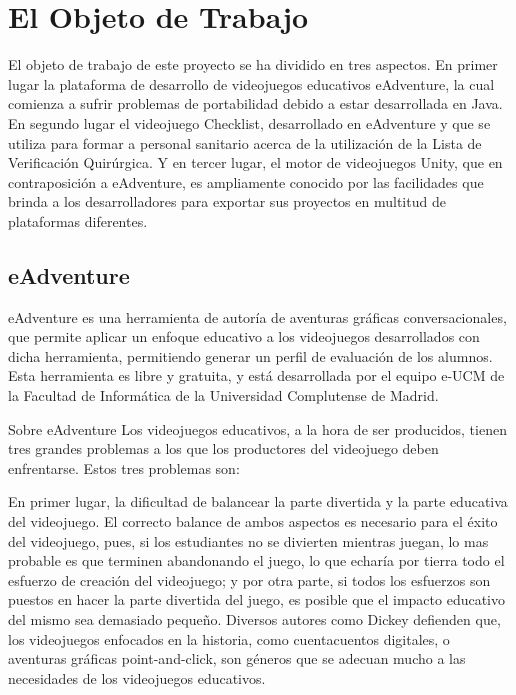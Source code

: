 \section{El Objeto de Trabajo}
\label{objetodetrabajo}

El objeto de trabajo de este proyecto se ha dividido en tres aspectos. En primer lugar la plataforma de desarrollo de videojuegos educativos eAdventure, la cual comienza a sufrir problemas de portabilidad debido a estar desarrollada en Java. En segundo lugar el videojuego Checklist, desarrollado en eAdventure y que se utiliza para formar a personal sanitario acerca de la utilización de la Lista de Verificación Quirúrgica. Y en tercer lugar, el motor de videojuegos Unity, que en contraposición a eAdventure, es ampliamente conocido por las facilidades que brinda a los desarrolladores para exportar sus proyectos en multitud de plataformas diferentes.

\subsection{eAdventure}
\label{eadventure}

eAdventure es una herramienta de autoría de aventuras gráficas conversacionales, que permite aplicar un enfoque educativo a los videojuegos desarrollados con dicha herramienta, permitiendo generar un perfil de evaluación de los alumnos. Esta herramienta es libre y gratuita, y está desarrollada por el equipo e-UCM de la Facultad de Informática de la Universidad Complutense de Madrid.

Sobre eAdventure Los videojuegos educativos, a la hora de ser producidos, tienen tres grandes problemas a los que los productores del videojuego deben enfrentarse. Estos tres problemas son: 

En primer lugar, la dificultad de balancear la parte divertida y la parte educativa del videojuego. El correcto balance de ambos aspectos es necesario para el éxito del videojuego, pues, si los estudiantes no se divierten mientras juegan, lo mas probable es que terminen abandonando el juego, lo que echaría por tierra todo el esfuerzo de creación del videojuego; y por otra parte, si todos los esfuerzos son puestos en hacer la parte divertida del juego, es posible que el impacto educativo del mismo sea demasiado pequeño. Diversos autores como Dickey defienden que, los videojuegos enfocados en la historia, como cuentacuentos digitales, o aventuras gráficas point-and-click, son géneros que se adecuan mucho a las necesidades de los videojuegos educativos.

